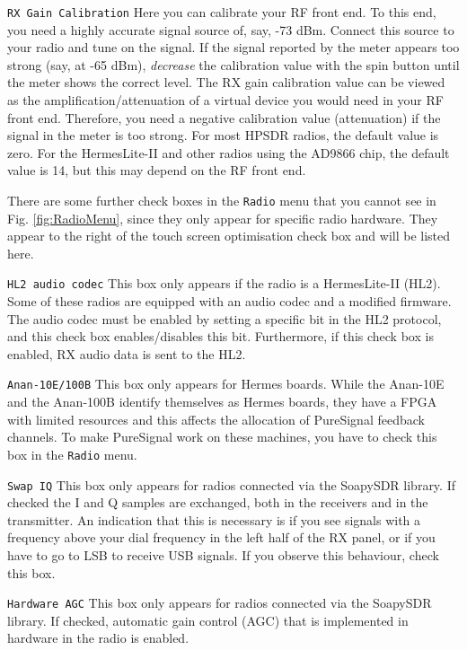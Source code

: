\documentclass[12pt]{book}
\def\rett#1{\texttt{\color{red}#1}}
\def\bltt#1{\texttt{\color{blue}#1}}
\begin{document}
\rett{RX Gain Calibration} Here you can calibrate your RF front end. To this end, you
need a highly accurate signal source of, say, -73 dBm. Connect this source to your
radio and tune on the signal. If the signal reported by the meter
appears too strong (say, at -65 dBm),
 \textit{decrease} the
calibration value with the spin button until the meter shows the correct level.
 The RX gain calibration value can be viewed as the  amplification/attenuation of
   a virtual device you
would need in your RF front end. Therefore, you need a negative calibration value (attenuation)
if the signal in the meter is too strong. For most HPSDR radios, the default value is
 zero. For the HermesLite-II and other radios using the AD9866 chip, the default
 value is 14, but this may depend on the RF front end.

 There are some further check boxes in the \bltt{Radio} menu that you cannot see
 in Fig. \ref{fig:RadioMenu}, since they only appear for specific radio hardware.
 They appear to the right of the touch screen optimisation check box
 and will be listed here.

 \rett{HL2 audio codec} This box only appears if the radio is a HermesLite-II (HL2). Some
 of these radios are equipped with an audio codec and a modified firmware. The
 audio codec must be enabled by setting a specific bit in the HL2 protocol,
 and this check box enables/disables this bit. Furthermore, if this check box
 is enabled, RX audio data is sent to the HL2.

 \rett{Anan-10E/100B} This box only appears for Hermes boards. While the Anan-10E and
 the Anan-100B identify themselves as Hermes boards, they have a FPGA with limited
 resources and this affects the allocation of PureSignal feedback channels. To make
 PureSignal work on these machines, you have to check this box in the \bltt{Radio} menu.

 \rett{Swap IQ} This box only appears for radios connected via the SoapySDR library. If checked
 the I and Q samples are exchanged, both in the receivers and in the transmitter. An indication
 that this is necessary is if you see signals with a frequency above your dial frequency in
 the left half of the RX panel, or if you have to go to LSB to receive USB signals. If you
 observe this behaviour, check this box.

 \rett{Hardware AGC} This box only appears for radios connected via the SoapySDR library.
 If checked, automatic gain control (AGC) that is implemented in hardware in the radio is enabled.
\end{document}

